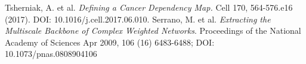 \documentclass[12pt]{article}
\begin{document}
 
\begin{thebibliography}{99}
 Tsherniak, A. et al. {\textit{Defining a Cancer Dependency Map.}} Cell 170, 564-576.e16 (2017). DOI: 10.1016/j.cell.2017.06.010.
 Serrano, M. et al. {\textit{Extracting the Multiscale Backbone of Complex Weighted Networks}}. Proceedings of the National Academy of Sciences Apr 2009, 106 (16) 6483-6488; DOI: 10.1073/pnas.0808904106

\end{thebibliography}
\end{document}

